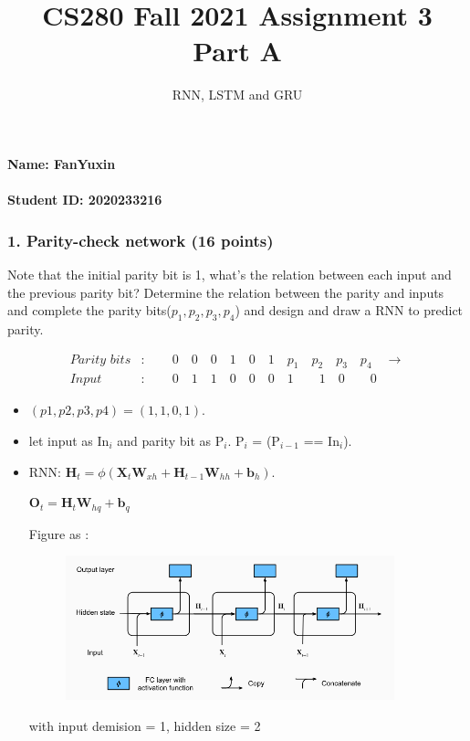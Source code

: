 \documentclass[12pt]{article}%
\begin{document}
\title{CS280 Fall 2021 Assignment 3 \\ Part A}
\author{RNN, LSTM and GRU}
\maketitle

\paragraph{Name: FanYuxin}

\paragraph{Student ID: 2020233216}

\newpage


\subsubsection*{1. Parity-check network (16 points)}
Note that the initial parity bit is 1, what's the relation between each input and the previous parity bit? Determine the relation between the parity and inputs and complete the parity bits($p_1,p_2,p_3,p_4$) and design and draw a RNN to predict parity. 
	
	\begin{align*}
	    \textit{Parity bits}&:\quad\quad0\quad0\quad0\quad1\quad0\quad1\quad p_1\quad p_2\quad p_3 \quad p_4 \quad\rightarrow \\
	    \textit{Input}&:\quad\quad0\quad1\quad1\quad0\quad0\quad0\quad1\qquad1\quad0\qquad0
	\end{align*}

\begin{itemize}
	\item $(p1, p2, p3, p4) = (1, 1, 0,  1)$.
	\item let input as In$_i$ and parity bit as P$_i$. P$_i$ = (P$_{i-1}$ == In$_i$).
	\item RNN: 
	$\mathbf{H}_t = \phi(\mathbf{X}_t \mathbf{W}_{xh} + \mathbf{H}_{t-1} \mathbf{W}_{hh}  + \mathbf{b}_h)$.
	
	$\mathbf{O}_t = \mathbf{H}_t \mathbf{W}_{hq} + \mathbf{b}_q$

	Figure as :
	\begin{figure}[H]
		\centering
		\includegraphics[width=0.9\textwidth]{rnn.png}
	\end{figure}
	
	
	with input demision = 1, hidden size = 2
\end{itemize}
\end{document}
